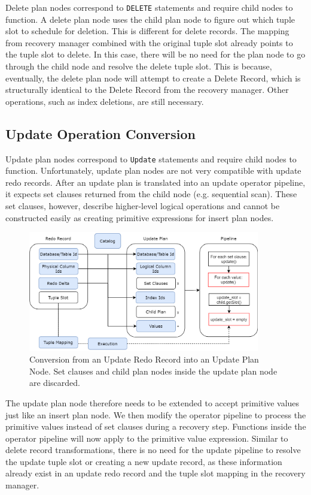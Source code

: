 \documentclass[12pt]{cmuthesis}
\begin{document}
Delete plan nodes correspond to \texttt{DELETE} statements and require child nodes to function. A delete plan node uses the child plan node to figure out which tuple slot to schedule for deletion. This is different for delete records. The mapping from recovery manager combined with the original tuple slot already points to the tuple slot to delete. In this case, there will be no need for the plan node to go through the child node and resolve the delete tuple slot. This is because, eventually, the delete plan node will attempt to create a Delete Record, which is structurally identical to the Delete Record from the recovery manager. Other operations, such as index deletions, are still necessary.

\subsection{Update Operation Conversion}
Update plan nodes correspond to \texttt{Update} statements and require child nodes to function. Unfortunately, update plan nodes are not very compatible with update redo records. After an update plan is translated into an update operator pipeline, it expects set clauses returned from the child node (e.g. sequential scan). These set clauses, however, describe higher-level logical operations and cannot be constructed easily as creating primitive expressions for insert plan nodes. 
\begin{figure}[H]
\centering
\includegraphics[width=0.9\textwidth]{images/UpdateConversion.png}
\caption{Conversion from an Update Redo Record into an Update Plan Node. Set clauses and child plan nodes inside the update plan node are discarded.}
\label{fig:update_conversion}
\end{figure}
The update plan node therefore needs to be extended to accept primitive values just like an insert plan node. We then modify the operator pipeline to process the primitive values instead of set clauses during a recovery step. Functions inside the operator pipeline will now apply to the primitive value expression. Similar to delete record transformations, there is no need for the update pipeline to resolve the update tuple slot or creating a new update record, as these information already exist in an update redo record and the tuple slot mapping in the recovery manager.
\end{document}
